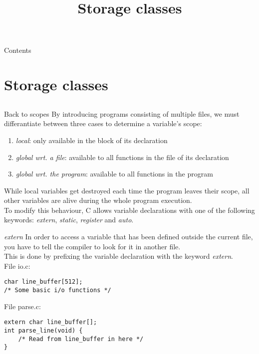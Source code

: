 
\newcommand{\topic}{
	Storage classes
}

\title{\topic}
\supertitle{\course}
\date{}



\maketitle

\begin{frame}{Contents}
	\tableofcontents
\end{frame}
\section{Storage classes}
\subsection{}

\begin{frame}{Back to scopes}
	By introducing programs consisting of multiple files, we must differantiate between three cases to determine a variable's scope:
	\begin{enumerate}
		\item \textit{local}: only available in the block of its declaration
		\item \textit{global wrt. a file}: available to all functions in the file of its declaration
		\item \textit{global wrt. the program}: available to all functions in the program
	\end{enumerate}\bigskip
	While local variables get destroyed each time the program leaves their scope, all other variables are alive during the whole program execution.\\ \bigskip
	To modify this behaviour, C allows variable declarations with one of the following keywords: \textit{extern}, \textit{static}, \textit{register} and \textit{auto}.
\end{frame}

\begin{frame}[fragile]{\textit{extern}}
	In order to access a variable that has been defined outside the current file, you have to tell the compiler to look for it in another file.\\
	This is done by prefixing the variable declaration with the keyword \textit{extern}.\\
	\bigskip
	File io.c:
	\begin{lstlisting}
char line_buffer[512];
/* Some basic i/o functions */
\end{lstlisting}
	File parse.c:
	\begin{lstlisting}
extern char line_buffer[];
int parse_line(void) {
	/* Read from line_buffer in here */
}
\end{lstlisting}

\end{frame}

